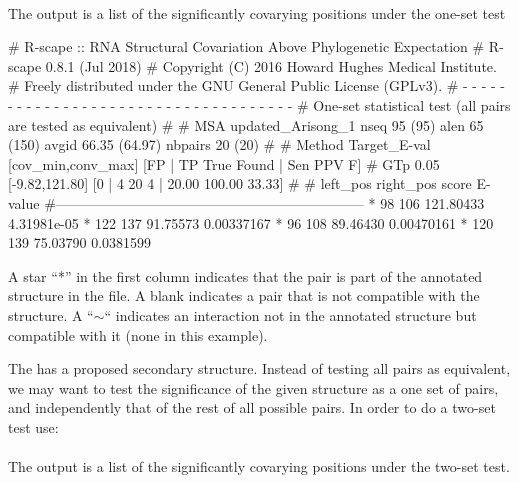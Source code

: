 \\

\noindent
The output is a list of the significantly covarying positions under the one-set test

\begin{sreoutput}
# R-scape :: RNA Structural Covariation Above Phylogenetic Expectation
# R-scape 0.8.1 (Jul 2018)
# Copyright (C) 2016 Howard Hughes Medical Institute.
# Freely distributed under the GNU General Public License (GPLv3).
# - - - - - - - - - - - - - - - - - - - - - - - - - - - - - - - - - - - -
# One-set statistical test (all pairs are tested as equivalent) 
#
# MSA updated_Arisong_1 nseq 95 (95) alen 65 (150) avgid 66.35 (64.97) nbpairs 20 (20)
#
# Method Target_E-val [cov_min,conv_max] [FP | TP True Found | Sen PPV F] 
# GTp    0.05         [-9.82,121.80]     [0 | 4 20 4 | 20.00 100.00 33.33] 
#
#       left_pos       right_pos        score           E-value
#------------------------------------------------------------------
*	      98	     106	121.80433	4.31981e-05
*	     122	     137	91.75573	0.00337167
*	      96	     108	89.46430	0.00470161
*	     120	     139	75.03790	0.0381599
\end{sreoutput}
A star ``*'' in the first column indicates that the pair is part of
the annotated structure in the  file. A
blank indicates a pair that is not compatible with the structure. A
``$\sim$`` indicates an interaction not in the annotated structure but
compatible with it (none in this example).

The  has a proposed secondary
structure.  Instead of testing all pairs as equivalent, we may want to
test the significance of the given structure as a one set of pairs,
and independently that of the rest of all possible pairs.  In order to
do a two-set test use:\\

\\

\noindent
The output is a list of the significantly covarying positions under the two-set test.

